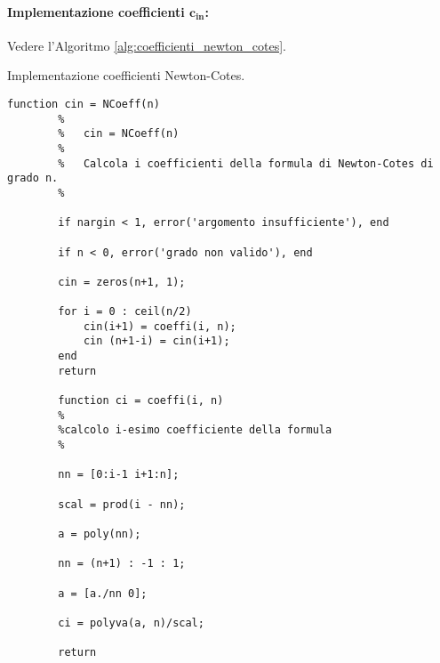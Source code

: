\paragraph{Implementazione coefficienti $\boldsymbol{c_{in}}$:} Vedere l'Algoritmo \ref{alg:coefficienti_newton_cotes}.

\begin{algorithm}
	\caption{Implementazione coefficienti Newton-Cotes.}\label{alg:coefficienti_newton_cotes}
	\begin{lstlisting}[style=Matlab-editor]
		function cin = NCoeff(n)
		%   
		%   cin = NCoeff(n)
		%
		%   Calcola i coefficienti della formula di Newton-Cotes di grado n.
		%
		
		if nargin < 1, error('argomento insufficiente'), end
		
		if n < 0, error('grado non valido'), end
		
		cin = zeros(n+1, 1);
		
		for i = 0 : ceil(n/2)
			cin(i+1) = coeffi(i, n);
			cin (n+1-i) = cin(i+1);
		end
		return
		
		function ci = coeffi(i, n)
		%
		%calcolo i-esimo coefficiente della formula
		%
		
		nn = [0:i-1 i+1:n];
		
		scal = prod(i - nn);
		
		a = poly(nn);
		
		nn = (n+1) : -1 : 1;
		
		a = [a./nn 0];
		
		ci = polyva(a, n)/scal;
		
		return
	\end{lstlisting}
\end{algorithm}

